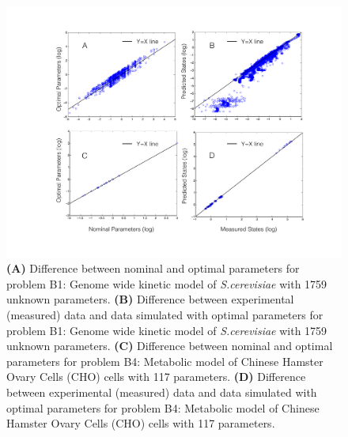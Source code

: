 \documentclass[12pt]{article}
\begin{document}
\begin{figure}[ht]
\centering
\includegraphics[width=1.00\textwidth]{./figs/Figure_S3_B1_B4_params_measuredstates.pdf}
\caption{ \textbf {(A)} Difference between nominal and optimal parameters for problem B1: Genome wide kinetic model of \textit{S.cerevisiae} with 1759 unknown parameters. \textbf {(B)} Difference between experimental (measured) data and data simulated with optimal parameters for problem B1: Genome wide kinetic model of \textit{S.cerevisiae} with 1759 unknown parameters. \textbf {(C)} Difference between nominal and optimal parameters for problem B4: Metabolic model of Chinese  Hamster Ovary Cells (CHO) cells with 117 parameters. \textbf {(D)} Difference between experimental (measured) data and data simulated with optimal parameters for problem B4: Metabolic model of Chinese  Hamster Ovary Cells (CHO) cells with 117 parameters.
}\label{fig-benchmark}
\end{figure}
\end{document}
